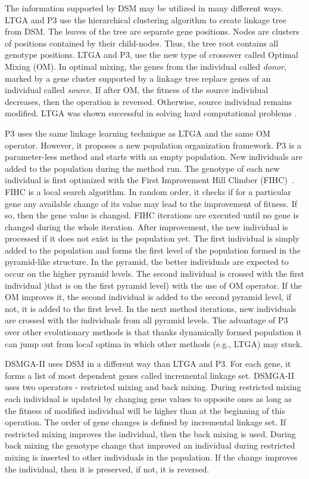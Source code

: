 The information supported by DSM may be utilized in many different ways. LTGA and P3 use the hierarchical clustering algorithm to create linkage tree from DSM. The leaves of the tree are separate gene positions. Nodes are clusters of positions contained by their child-nodes. Thus, the tree root contains all genotype positions. LTGA and P3, use the new type of crossover called Optimal Mixing (OM). In optimal mixing, the genes from the individual called \textit{donor}, marked by a gene cluster supported by a linkage tree replace genes of an individual called \textit{source}. If after OM, the fitness of the source individual decreases, then the operation is reversed. Otherwise, source individual remains modified. LTGA was shown successful in solving hard computational problems \cite{ltga}.\par

P3 \cite{P3Original,P3add,P3runtime} uses the same linkage learning technique as LTGA and the same OM operator. However, it proposes a new population organization framework. P3 is a parameter-less method and starts with an empty population. New individuals are added to the population during the method run. The genotype of each new individual is first optimized with the First Improvement Hill Climber (FIHC)~\cite{P3Original}. FIHC is a local search algorithm. In random order, it checks if for a particular gene any available change of its value may lead to the improvement of fitness. If so, then the gene value is changed. FIHC iterations are executed until no gene is changed during the whole iteration. After improvement, the new individual is processed if it does not exist in the population yet. The first individual is simply added to the population and forms the first level of the population formed in the pyramid-like structure. In the pyramid, the better individuals are expected to occur on the higher pyramid levels. The second individual is crossed with the first individual )that is on the first pyramid level) with the use of OM operator. If the OM improves it, the second individual is added to the second pyramid level, if not, it is added to the first level. In the next method iterations, new individuals are crossed with the individuals from all pyramid levels. The advantage of P3 over other evolutionary methods is that thanks dynamically formed population it can jump out from local optima in which other methods (e.g., LTGA) may stuck.\par

DSMGA-II uses DSM in a different way than LTGA and P3. For each gene, it forms a list of most dependent genes called incremental linkage set. DSMGA-II uses two operators - restricted mixing and back mixing. During restricted mixing each individual is updated by changing gene values to opposite ones as long as the fitness of modified individual will be higher than at the beginning of this operation. The order of gene changes is defined by incremental linkage set. If restricted mixing improves the individual, then the back mixing is used. During back mixing the genotype change that improved an individual during restricted mixing is inserted to other individuals in the population. If the change improves the individual, then it is preserved, if not, it is reversed.\par

